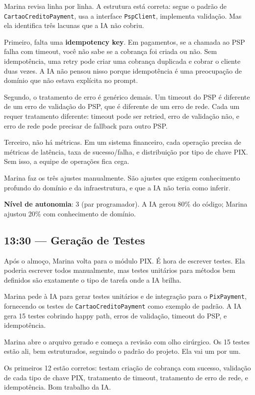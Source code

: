 Marina revisa linha por linha. A estrutura está correta: segue o padrão de
\texttt{CartaoCreditoPayment}, usa a interface \texttt{PspClient}, implementa
validação. Mas ela identifica três lacunas que a IA não cobriu.

Primeiro, falta uma \textbf{idempotency key}. Em pagamentos, se a chamada ao PSP
falha com timeout, você não sabe se a cobrança foi criada ou não. Sem idempotência,
uma retry pode criar uma cobrança duplicada e cobrar o cliente duas vezes. A IA
não pensou nisso porque idempotência é uma preocupação de domínio que não estava
explícita no prompt.

Segundo, o tratamento de erro é genérico demais. Um timeout do PSP é diferente de um
erro de validação do PSP, que é diferente de um erro de rede. Cada um requer
tratamento diferente: timeout pode ser retried, erro de validação não, e erro de rede
pode precisar de fallback para outro PSP.

Terceiro, não há métricas. Em um sistema financeiro, cada operação precisa de métricas
de latência, taxa de sucesso/falha, e distribuição por tipo de chave PIX. Sem isso,
a equipe de operações fica cega.

Marina faz os três ajustes manualmente. São ajustes que exigem conhecimento profundo
do domínio e da infraestrutura, e que a IA não teria como inferir.

\textbf{Nível de autonomia}: 3 (par programador). A IA gerou 80\% do
código; Marina ajustou 20\% com conhecimento de domínio.

\subsection{13:30 --- Geração de Testes}

Após o almoço, Marina volta para o módulo PIX. É hora de escrever testes. Ela poderia
escrever todos manualmente, mas testes unitários para métodos bem definidos são
exatamente o tipo de tarefa onde a IA brilha.

Marina pede à IA para gerar testes unitários e de integração para o
\texttt{PixPayment}, fornecendo os testes de \texttt{CartaoCreditoPayment}
como exemplo de padrão. A IA gera 15 testes cobrindo happy path, erros de
validação, timeout do PSP, e idempotência.

Marina abre o arquivo gerado e começa a revisão com olho cirúrgico. Os 15 testes
estão ali, bem estruturados, seguindo o padrão do projeto. Ela vai um por um.

Os primeiros 12 estão corretos: testam criação de cobrança com sucesso, validação de
cada tipo de chave PIX, tratamento de timeout, tratamento de erro de rede, e
idempotência. Bom trabalho da IA.

